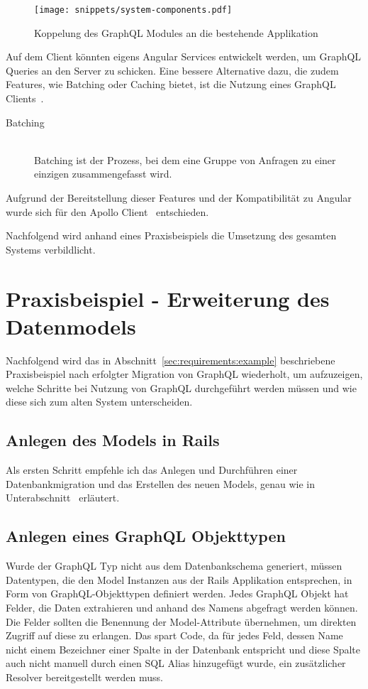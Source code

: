 \begin{figure}[h!]
	\centering
	\texttt{[image: snippets/system-components.pdf]}
	\caption{Koppelung des GraphQL Modules an die bestehende Applikation}
	\label{graphql:integration}
\end{figure}

Auf dem Client könnten eigens Angular Services entwickelt werden, um GraphQL Queries an den Server zu schicken. Eine bessere Alternative dazu, die zudem Features, wie Batching oder Caching bietet, ist die Nutzung eines GraphQL Clients~\cite{graphql-client}. 

\begin{description}
	\item[Batching] \ \\
	Batching ist der Prozess, bei dem eine Gruppe von Anfragen zu einer einzigen zusammengefasst wird. 
\end{description}

Aufgrund der Bereitstellung dieser Features und der Kompatibilität zu Angular~\cite{apollo-angular-doc} wurde sich für den Apollo Client~\cite{apollo-angular} entschieden.

Nachfolgend wird anhand eines Praxisbeispiels die Umsetzung des gesamten Systems verbildlicht.
\section{Praxisbeispiel - Erweiterung des Datenmodels}
Nachfolgend wird das in Abschnitt~\ref{sec:requirements:example} beschriebene Praxisbeispiel nach erfolgter Migration von GraphQL wiederholt, um aufzuzeigen, welche Schritte bei Nutzung von GraphQL durchgeführt werden müssen und wie diese sich zum alten System unterscheiden.

\subsection{Anlegen des Models in Rails}
\label{impl:graphql:model}
Als ersten Schritt empfehle ich das Anlegen und Durchführen einer Datenbankmigration und das Erstellen des neuen Models, genau wie in Unterabschnitt~ erläutert. 

\subsection{Anlegen eines GraphQL Objekttypen}
\label{impl:graphql:graphqltype}
\label{graphql:objecttype}
Wurde der GraphQL Typ nicht aus dem Datenbankschema generiert, müssen Datentypen, die den Model Instanzen aus der Rails Applikation entsprechen, in Form von GraphQL-Objekttypen definiert werden. 
Jedes GraphQL Objekt hat Felder, die Daten extrahieren und anhand des Namens abgefragt werden können. 
Die Felder sollten die Benennung der Model-Attribute übernehmen, um direkten Zugriff auf diese zu erlangen. Das spart Code, da für jedes Feld, dessen Name nicht einem Bezeichner einer Spalte in der Datenbank entspricht und diese Spalte auch nicht manuell durch einen SQL Alias hinzugefügt wurde, ein zusätzlicher Resolver bereitgestellt werden muss.

